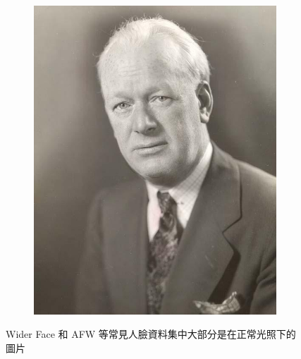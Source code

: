 \begin{figure}[t]
\begin{subfigure}[b]{0.3\textwidth}
    \includegraphics[width=\textwidth]{figures/data_6}
\end{subfigure}
\caption[常見人臉資料集中的圖片範例]{Wider Face 和 AFW 等常見人臉資料集中大部分是在正常光照下的圖片}
\label{fig:general_face}
\end{figure}

